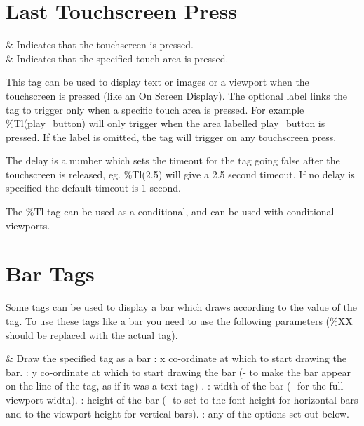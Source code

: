 {  \section{Last Touchscreen Press}
    \begin{tagmap}
       & Indicates that the touchscreen is pressed.\\
       & Indicates that the specified touch area is pressed.\\
    \end{tagmap}
  This tag can be used to display text or images or a viewport when the
  touchscreen is pressed (like an On Screen Display). The optional label
  links the tag to trigger only when a specific touch area is pressed.
  For example \%Tl(play\_button) will only trigger when the area labelled
  play\_button is pressed. If the label is omitted, the tag will trigger
  on any touchscreen press.

  The delay is a number which sets the timeout for the tag going false
  after the touchscreen is released, eg. \%Tl(2.5) will give a 2.5 second
  timeout. If no delay is specified the default timeout is 1 second.

  The \%Tl tag can be used as a conditional, and can be used with
  conditional viewports.
}

\section{\label{ref:bar_tags}Bar Tags}
  Some tags can be used to display a bar which draws according to the value of
  the tag. To use these tags like a bar you need to use the following parameters
  (\%XX should be replaced with the actual tag).


\begin{tagmap}
    & Draw the specified tag as a bar\newline
      : x co-ordinate at which to start drawing the bar.\newline
      : y co-ordinate at which to start drawing the bar (- to make the
        bar appear on the line of the tag, as if it was a text tag) .\newline
      : width of the bar (- for the full viewport width).\newline
      : height of the bar (- to set to the font height for
        horizontal bars and to the viewport height for vertical bars).\newline
      : any of the options set out below.\\
\end{tagmap}

